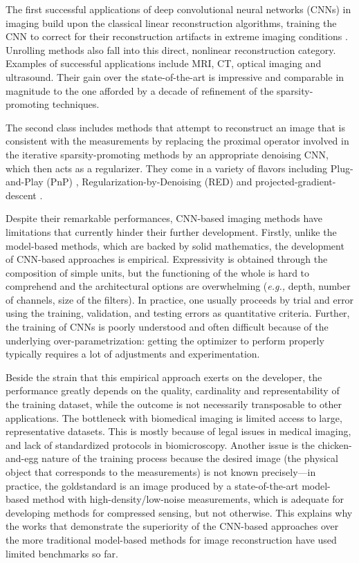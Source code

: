 \documentclass[journal]{IEEEtran}
\begin{document}
The first successful applications of deep convolutional neural networks (CNNs) in imaging build upon the classical linear reconstruction algorithms, training the CNN to correct for their reconstruction artifacts in extreme imaging conditions \cite{jin2017deep,chen2017low,hyun2018deep,monakhova2019learned,perdios2020cnn}. Unrolling methods \cite{gregor2010learning,chen2016trainable,sun2016deep,aggarwal2018modl,adler2018learned,monga2021algorithm} also fall into this direct, nonlinear reconstruction category. Examples of successful applications include MRI, CT, optical imaging and ultrasound. Their gain over the state-of-the-art is impressive and comparable in magnitude to the one afforded by a decade of refinement of the sparsity-promoting techniques.

The second class includes methods that attempt to reconstruct an image that is consistent with the measurements by replacing the proximal operator involved in the iterative sparsity-promoting methods by an appropriate denoising CNN, which then acts as a regularizer. They come in a variety of flavors including Plug-and-Play (PnP) \cite{venkatakrishnan2013plug,ryu2019plug,zhang2021plug,sun2021scalable}, Regularization-by-Denoising (RED) \cite{romano2017little,sun2019block,wu2020simba} and projected-gradient-descent \cite{rick2017one,gupta2018cnn}.

Despite their remarkable performances, CNN-based imaging methods have limitations that currently hinder their further development. Firstly, unlike the model-based methods, which are backed by solid mathematics, the development of CNN-based approaches is empirical. Expressivity is obtained through the composition of simple units, but the functioning of the whole is hard to comprehend and the architectural options are overwhelming (\textit{e.g.,} depth, number of channels, size of the filters). In practice, one usually proceeds by trial and error using the training, validation, and testing errors as
quantitative criteria. Further, the training of CNNs is poorly understood and often difficult because of the underlying over-parametrization: getting the optimizer to perform properly typically requires a lot of adjustments and experimentation. 

Beside the strain that this empirical approach exerts on the developer, the performance greatly depends on the quality, cardinality and representability of the
training dataset, while the outcome is not necessarily transposable to other applications. The bottleneck with biomedical imaging is limited access to large, representative datasets. This is mostly because of legal issues in medical imaging, and lack of standardized protocols in biomicroscopy. Another issue is the chicken-and-egg nature of the training process because the desired image (the physical object that corresponds to the measurements) is not known precisely---in practice, the goldstandard is an image produced by a state-of-the-art model-based method with high-density/low-noise measurements, which is adequate for developing methods for compressed sensing, but not otherwise. This explains why the works that demonstrate the superiority of the
CNN-based approaches over the more traditional model-based methods for image reconstruction have used limited benchmarks so far.
\end{document}
